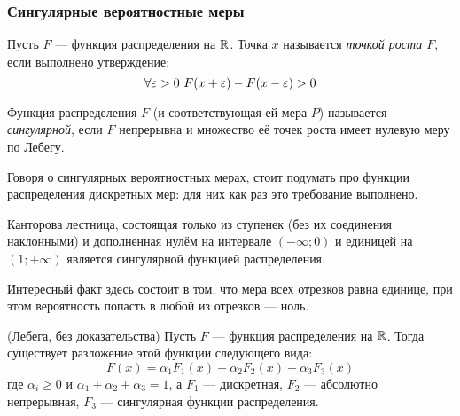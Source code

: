 \subsubsection{Сингулярные вероятностные меры}

\begin{definition}
	Пусть $F$ --- функция распределения на $\mathbb{R}$. Точка $x$ называется \textit{точкой роста $F$}, если выполнено утверждение:
	\[
		\forall \varepsilon > 0\ F(x + \varepsilon) - F(x - \varepsilon) > 0
	\]
\end{definition}

\begin{definition}
	Функция распределения $F$ (и соответствующая ей мера $P$) называется \textit{сингулярной}, если $F$ непрерывна и множество её точек роста имеет нулевую меру по Лебегу.
\end{definition}

\begin{note}
	Говоря о сингулярных вероятностных мерах, стоит подумать про функции распределения дискретных мер: для них как раз это требование выполнено.
\end{note}

\begin{example}
	Канторова лестница, состоящая только из ступенек (без их соединения наклонными) и дополненная нулём на интервале $(-\infty; 0)$ и единицей на $(1; +\infty)$ является сингулярной функцией распределения.
	
	Интересный факт здесь состоит в том, что мера всех отрезков равна единице, при этом вероятность попасть в любой из отрезков --- ноль.
\end{example}

\begin{theorem} (Лебега, без доказательства)
	Пусть $F$ --- функция распределения на $\mathbb{R}$. Тогда существует разложение этой функции следующего вида:
	\[
		F(x) = \alpha_1 F_1(x) + \alpha_2 F_2(x) + \alpha_3 F_3(x)
	\]
	где $\alpha_i \ge 0$ и $\alpha_1 + \alpha_2 + \alpha_3 = 1$, а $F_1$ --- дискретная, $F_2$ --- абсолютно непрерывная, $F_3$ --- сингулярная функции распределения.
\end{theorem}